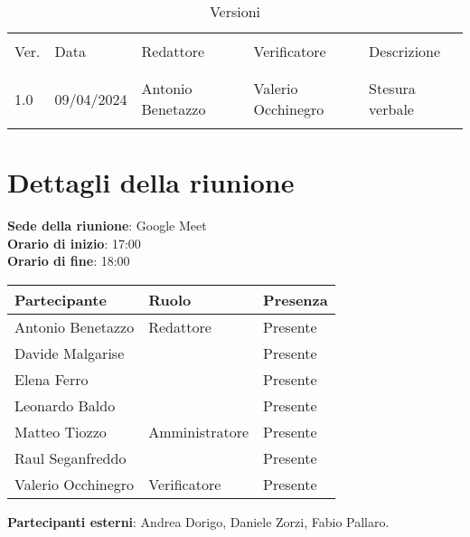 \documentclass[italian,12pt]{article}
\begin{document}


\newpage



\begin{table}[!h]
	\caption{Versioni}
	\footnotesize
	\begin{center}
		\begin{tabular}{ l l l l l }
			\hline                                                                                                      \\[-2ex]
			Ver. & Data       & Redattore          & Verificatore       & Descrizione                                   \\
			\\[-2ex] \hline \\[-1.5ex]
			1.0  & 09/04/2024 & Antonio Benetazzo  & Valerio Occhinegro & Stesura verbale                               \\
			\\[-1.5ex] \hline
		\end{tabular}
	\end{center}
\end{table}

\newpage

\tableofcontents

\newpage

\section{Dettagli della riunione}


\textbf{Sede della riunione}: Google Meet\\
\textbf{Orario di inizio}: 17:00\\
\textbf{Orario di fine}: 18:00\\


\begin{flushleft}
	\begin{table}[!h]
	\begin{tabular}{ |l|l|l| } 
		\hline
		\textbf{Partecipante} & \textbf{Ruolo}       & \textbf{Presenza} \\
		\hline 
		Antonio Benetazzo     & Redattore            & Presente          \\
		Davide Malgarise      &                      & Presente          \\
		Elena Ferro           &                      & Presente          \\
		Leonardo Baldo        &                      & Presente          \\
		Matteo Tiozzo         & Amministratore       & Presente          \\
		Raul Seganfreddo      &                      & Presente          \\
		Valerio Occhinegro    & Verificatore         & Presente          \\
		\hline
	\end{tabular}
	\end{table}
	\textbf{Partecipanti esterni}: Andrea Dorigo, Daniele Zorzi, Fabio Pallaro.
\end{flushleft}
\end{document}
